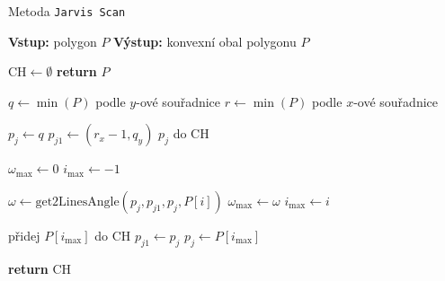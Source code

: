 \begin{algorithm}
    \caption{Metoda \texttt{Jarvis Scan}}
    \begin{algorithmic}[1]
        \STATE \textbf{Vstup:} polygon $P$
        \STATE \textbf{Výstup:} konvexní obal polygonu $P$

        \STATE $\text{CH} \gets \emptyset$
            \STATE \textbf{return} $P$
        \ENDIF

        \STATE $q \gets \min(P)$ podle $y$-ové souřadnice
        \STATE $r \gets \min(P)$ podle $x$-ové souřadnice

        \STATE $p_j \gets q$
        \STATE $p_{j1} \gets (r_x - 1, q_y)$
        \STATE {} $p_j$ do $\text{CH}$

        \REPEAT
            \STATE $\omega_{\text{max}} \gets 0$
            \STATE $i_{\text{max}} \gets -1$

                \STATE $\omega \gets \text{get2LinesAngle}(p_j, p_{j1}, p_j, P[i])$
                    \STATE $\omega_{\text{max}} \gets \omega$
                    \STATE $i_{\text{max}} \gets i$
                \ENDIF
            \ENDFOR

            \STATE přidej $P[i_{\text{max}}]$ do $\text{CH}$
            \STATE $p_{j1} \gets p_j$
            \STATE $p_j \gets P[i_{\text{max}}]$

        \STATE \textbf{return} $\text{CH}$
    \end{algorithmic}
\end{algorithm}